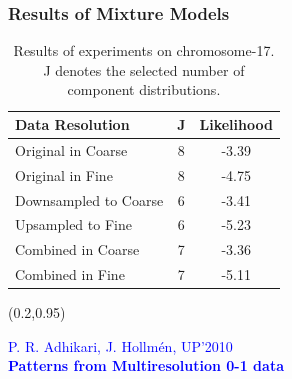 \documentclass[first=dgreen,second=purple,logo=redexc]{aaltoslides}
\newcommand\FrameText[1]{%
  \begin{textblock*}{0.98\textwidth}(0.2\textwidth,0.95\textheight)
    \textcolor {blue}{\scriptsize\raggedright #1\hspace{0.1\textwidth}}
  \end{textblock*}}
\begin{document}
\begin{frame}
\frametitle{Results of Mixture Models}
\begin{table}[h!]
  \centering
  \begin{tabular}{|l|c|c|}
    \hline
    \textbf{Data Resolution} & \textbf{J} &\textbf{Likelihood}  \\
    \hline
    Original in Coarse		&	8	& 	-3.39  \\ \hline
    Original in Fine		&	8	& 	-4.75 \\ \hline
    Downsampled to Coarse	&	6	& 	-3.41  \\ \hline
    Upsampled to Fine		&	6	& 	-5.23  \\ \hline
    Combined  in Coarse 	&	7	& 	-3.36  \\ \hline
    Combined in Fine		&	7	& 	-5.11  \\ \hline     
  \end{tabular}
  \caption{Results of experiments on chromosome-17. J denotes the selected number of component distributions. }\label{Tab:results}
\end{table}
\FrameText{P. R. Adhikari, J. Hollm{\'e}n, UP'2010 \\ \vspace{-2mm} \textbf{Patterns from Multiresolution 0-1 data}}
\end{frame}

\end{document}
